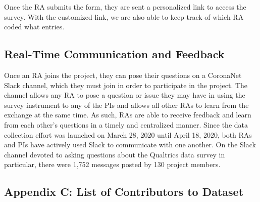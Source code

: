 \documentclass[]{article}
\begin{document}
Once the RA submits the form, they are sent a personalized link to access the survey. With the customized link, we are also able to keep track of which RA coded what entries.

\hypertarget{real-time-communication-and-feedback}{%
\subsection{Real-Time Communication and Feedback}\label{real-time-communication-and-feedback}}

Once an RA joins the project, they can pose their questions on a CoronaNet Slack channel, which they must join in order to participate in the project. The channel allows any RA to pose a question or issue they may have in using the survey instrument to any of the PIs and allows all other RAs to learn from the exchange at the same time. As such, RAs are able to receive feedback and learn from each other's questions in a timely and centralized manner. Since the data collection effort was launched on March 28, 2020 until April 18, 2020, both RAs and PIs have actively used Slack to communicate with one another. On the Slack channel devoted to asking questions about the Qualtrics data survey in particular, there were 1,752 messages posted by 130 project members.

\hypertarget{appendix-c-list-of-contributors-to-dataset}{%
\subsection*{Appendix C: List of Contributors to Dataset}\label{appendix-c-list-of-contributors-to-dataset}}
\end{document}
